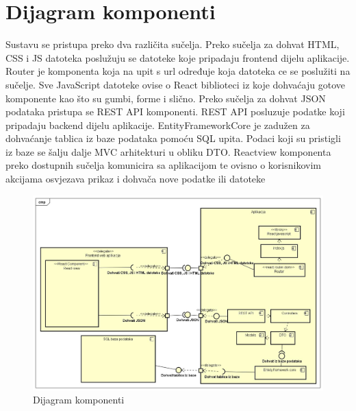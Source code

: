 			\eject
			
		\section{Dijagram komponenti}
		
		
			{ Sustavu se pristupa preko dva različita sučelja. Preko sučelja za dohvat HTML, CSS i JS datoteka poslužuju se
			datoteke koje pripadaju frontend dijelu aplikacije. Router je komponenta koja na
			upit s url određuje koja datoteka ce se poslužiti na sučelje. Sve JavaScript datoteke ovise o React biblioteci iz
			koje dohvaćaju gotove komponente kao što su gumbi, forme i slično. Preko sučelja
			za dohvat JSON podataka pristupa se REST API komponenti. REST API posluzuje
			podatke koji pripadaju backend dijelu aplikacije. EntityFrameworkCore je zadužen
			za dohvaćanje tablica iz baze podataka pomoću SQL upita. Podaci koji su pristigli
			iz baze se šalju dalje MVC arhitekturi u obliku DTO. Reactview komponenta preko dostupnih sučelja komunicira sa aplikacijom
			te ovisno o korisnikovim akcijama osvjezava prikaz i dohvača nove podatke ili datoteke }

			\begin{figure}[H]
				\includegraphics[scale=0.3]{slike/Dijagram komponenti}
				\centering
				\caption{Dijagram komponenti}
				\label{fig:komponente}
			\end{figure}
			 
	\fi %